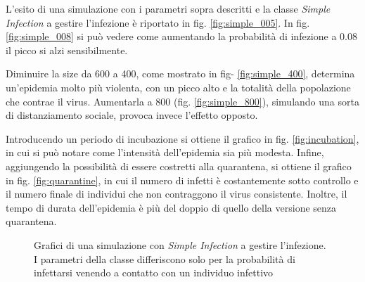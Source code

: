 \documentclass[a4paper,10pt,twocolumn]{article}
\begin{document}
L'esito di una simulazione con i parametri sopra descritti e la classe \emph{Simple Infection} a gestire l'infezione è riportato in fig. \ref{fig:simple_005}. In fig. \ref{fig:simple_008} si può vedere come aumentando la probabilità di infezione a 0.08 il picco si alzi sensibilmente.

Diminuire la size da 600 a 400, come mostrato in fig- \ref{fig:simple_400}, determina un'epidemia molto più violenta, con un picco alto e la totalità della popolazione che contrae il virus. Aumentarla a 800 (fig. \ref{fig:simple_800}), simulando una sorta di distanziamento sociale, provoca invece l'effetto opposto.

Introducendo un periodo di incubazione si ottiene il grafico in fig. \ref{fig:incubation}, in cui si può notare come l'intensità dell'epidemia sia più modesta. Infine, aggiungendo la possibilità di essere costretti alla quarantena, si ottiene il grafico in fig. \ref{fig:quarantine}, in cui il numero di infetti è costantemente sotto controllo e il numero finale di individui che non contraggono il virus consistente. Inoltre, il tempo di durata dell'epidemia è più del doppio di quello della versione senza quarantena.

\begin{figure}[p]
    \centering
    \caption{Grafici di una simulazione con \emph{Simple Infection} a gestire l'infezione. I parametri della classe differiscono solo per la probabilità di infettarsi venendo a contatto con un individuo infettivo}
\end{figure}
\end{document}
